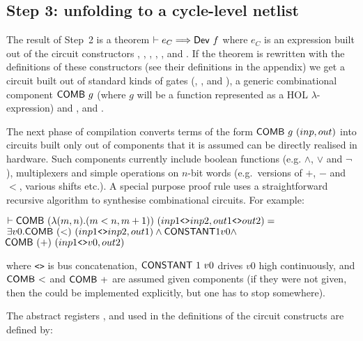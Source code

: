 \documentclass{llncs}
\begin{document}
\vspace*{-3mm}

\subsection*{Step 3: unfolding to a cycle-level netlist}

The result of Step~2 is a theorem
$\vdash e_C \Longrightarrow \mathsf{Dev}~f$ where $e_C$ is an expression built out of the circuit
constructors , 
, , , ,  and . If the theorem
is rewritten with the definitions of these constructors (see their
definitions in the appendix) we get a circuit built out of standard
kinds of gates (, ,  and ), a
generic combinational component $\mathsf{COMB}~g$ (where $g$ will be a
function represented as a HOL $\lambda$-expression) and 
,  and . 

The next phase of compilation converts terms of the form $\mathsf{COMB}~g~(inp,out)$
into circuits built only out of components that it is assumed can be directly realised in
hardware. Such components  currently include boolean functions (e.g. $\wedge$,
$\vee$ and $\neg$), multiplexers and simple operations  on $n$-bit words (e.g.~versions
of $+$, $-$ and $<$, various shifts etc.). 
A special purpose proof rule uses a straightforward recursive algorithm to synthesise
combinational circuits. For example:


{\begin{alltt}
\( \vdash \DEF{COMB}\ ({\lambda}(m,n). (m<n, m+1))\ (inp1\texttt{<>}inp2,out1\texttt{<>}out2) =              \)
\(     {\exists}v0. \DEF{COMB}\ ({<})\ (inp1\texttt{<>}inp2,out1) \wedge \DEF{CONSTANT} 1 v0 \wedge \)
\(         \! \DEF{COMB}\ ({+})\ (inp1\texttt{<>}v0,out2)                                              \)
\end{alltt}}

\vspace*{-1mm}

\noindent where \texttt{<>} is bus concatenation,
$\mathsf{CONSTANT}~1~v0$ drives $v0$ high continuously, and
$\mathsf{COMB}~{<}$ and $\mathsf{COMB}~{+}$ are assumed
given components (if they were not given, then the could be
implemented explicitly, but one has to stop somewhere). 
 
The abstract registers ,  and  used in the definitions of
the circuit constructs are defined by:
\end{document}
